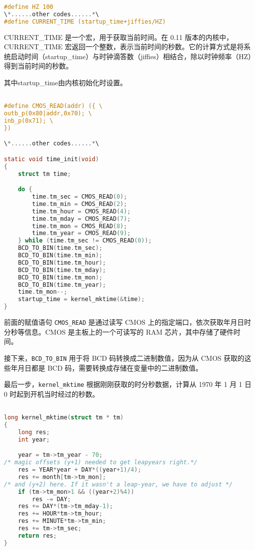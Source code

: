 \documentclass[12pt,hyperref,a4paper,UTF8]{ctexart}
\begin{document}
\begin{lstlisting}[language=C, caption=CURRENT\_TIME in sched.h, label=CURRENT_TIME]
#define HZ 100
\*......other codes......*\
#define CURRENT_TIME (startup_time+jiffies/HZ)
\end{lstlisting}

CURRENT\_TIME 是一个宏，用于获取当前时间。在 0.11 版本的内核中，CURRENT\_TIME 宏返回一个整数，表示当前时间的秒数。它的计算方式是将系统启动时间（startup\_time）与时钟滴答数（jiffies）相结合，除以时钟频率（HZ）得到当前时间的秒数。

其中startup\_time由内核初始化时设置\cite{shank2023linux}。

\begin{lstlisting}[language=C, caption=time\_init() in main.c, label=kernel_start]

#define CMOS_READ(addr) ({ \
outb_p(0x80|addr,0x70); \
inb_p(0x71); \
})

\*......other codes......*\

static void time_init(void)
{
	struct tm time;

	do {
		time.tm_sec = CMOS_READ(0);
		time.tm_min = CMOS_READ(2);
		time.tm_hour = CMOS_READ(4);
		time.tm_mday = CMOS_READ(7);
		time.tm_mon = CMOS_READ(8);
		time.tm_year = CMOS_READ(9);
	} while (time.tm_sec != CMOS_READ(0));
	BCD_TO_BIN(time.tm_sec);
	BCD_TO_BIN(time.tm_min);
	BCD_TO_BIN(time.tm_hour);
	BCD_TO_BIN(time.tm_mday);
	BCD_TO_BIN(time.tm_mon);
	BCD_TO_BIN(time.tm_year);
	time.tm_mon--;
	startup_time = kernel_mktime(&time);
}
\end{lstlisting}

前面的赋值语句 \lstinline|CMOS_READ| 是通过读写 CMOS 上的指定端口，依次获取年月日时分秒等信息。CMOS 是主板上的一个可读写的 RAM 芯片，其中存储了硬件时间。

接下来，\lstinline|BCD_TO_BIN| 用于将 BCD 码转换成二进制数值，因为从 CMOS 获取的这些年月日都是 BCD 码，需要转换成存储在变量中的二进制数值。

最后一步，\lstinline|kernel_mktime| 根据刚刚获取的时分秒数据，计算从 1970 年 1 月 1 日 0 时起到开机当时经过的秒数。

\begin{lstlisting}[language=C, caption=kernel\_mktime() in mktime.c, label=mktime]

long kernel_mktime(struct tm * tm)
{
	long res;
	int year;

	year = tm->tm_year - 70;
/* magic offsets (y+1) needed to get leapyears right.*/
	res = YEAR*year + DAY*((year+1)/4);
	res += month[tm->tm_mon];
/* and (y+2) here. If it wasn't a leap-year, we have to adjust */
	if (tm->tm_mon>1 && ((year+2)%4))
		res -= DAY;
	res += DAY*(tm->tm_mday-1);
	res += HOUR*tm->tm_hour;
	res += MINUTE*tm->tm_min;
	res += tm->tm_sec;
	return res;
}
\end{lstlisting}
\end{document}
